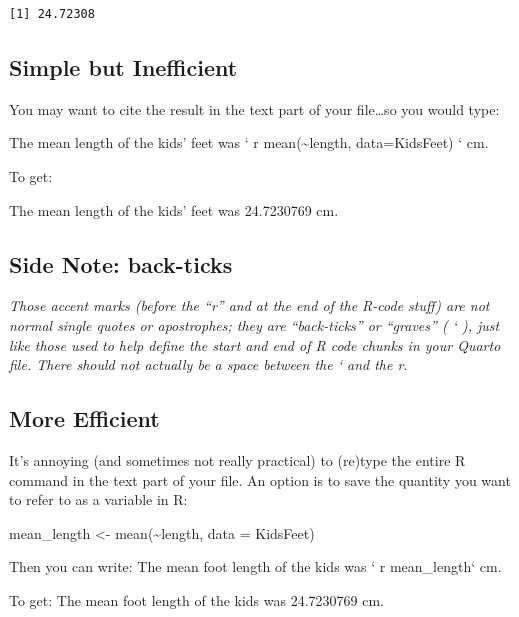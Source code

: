 \documentclass[
  letterpaper,
  DIV=11,
  numbers=noendperiod]{scrreprt}
\newenvironment{Shaded}{\begin{snugshade}}{\end{snugshade}}
\newcommand{\AttributeTok}[1]{\textcolor[rgb]{0.40,0.45,0.13}{#1}}
\newcommand{\FunctionTok}[1]{\textcolor[rgb]{0.28,0.35,0.67}{#1}}
\newcommand{\NormalTok}[1]{\textcolor[rgb]{0.00,0.23,0.31}{#1}}
\newcommand{\OtherTok}[1]{\textcolor[rgb]{0.00,0.23,0.31}{#1}}
\newcommand{\SpecialCharTok}[1]{\textcolor[rgb]{0.37,0.37,0.37}{#1}}
\theoremstyle{remark}
\begin{document}
\begin{verbatim}
[1] 24.72308
\end{verbatim}

\subsection{Simple but Inefficient}\label{simple-but-inefficient}

You may want to cite the result in the text part of your file\ldots so
you would type:

The mean length of the kids' feet was ` r mean(\textasciitilde length,
data=KidsFeet) ` cm.

To get:

The mean length of the kids' feet was 24.7230769 cm.

\subsection{Side Note: back-ticks}\label{side-note-back-ticks}

\emph{Those accent marks (before the ``r'' and at the end of the R-code
stuff) are not normal single quotes or apostrophes; they are
``back-ticks'' or ``graves'' ( ` ), just like those used to help define
the start and end of R code chunks in your Quarto file. There should not
actually be a space between the ` and the r.}

\subsection{More Efficient}\label{more-efficient}

It's annoying (and sometimes not really practical) to (re)type the
entire R command in the text part of your file. An option is to save the
quantity you want to refer to as a variable in R:

\begin{Shaded}
\begin{Highlighting}[]
\NormalTok{mean\_length }\OtherTok{\textless{}{-}} \FunctionTok{mean}\NormalTok{(}\SpecialCharTok{\textasciitilde{}}\NormalTok{length, }\AttributeTok{data =}\NormalTok{ KidsFeet)}
\end{Highlighting}
\end{Shaded}

Then you can write: The mean foot length of the kids was ` r
mean\_length` cm.

To get: The mean foot length of the kids was 24.7230769 cm.
\end{document}
